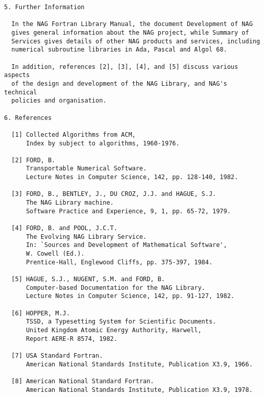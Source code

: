 \newpage
\begin{verbatim}
5. Further Information
 
  In the NAG Fortran Library Manual, the document Development of NAG
  gives general information about the NAG project, while Summary of
  Services gives details of other NAG products and services, including
  numerical subroutine libraries in Ada, Pascal and Algol 68.
 
  In addition, references [2], [3], [4], and [5] discuss various aspects
  of the design and development of the NAG Library, and NAG's technical
  policies and organisation.
 
6. References
 
  [1] Collected Algorithms from ACM,
      Index by subject to algorithms, 1960-1976.
 
  [2] FORD, B.
      Transportable Numerical Software.
      Lecture Notes in Computer Science, 142, pp. 128-140, 1982.
 
  [3] FORD, B., BENTLEY, J., DU CROZ, J.J. and HAGUE, S.J.
      The NAG Library machine.
      Software Practice and Experience, 9, 1, pp. 65-72, 1979.
 
  [4] FORD, B. and POOL, J.C.T.
      The Evolving NAG Library Service.
      In: `Sources and Development of Mathematical Software',
      W. Cowell (Ed.).
      Prentice-Hall, Englewood Cliffs, pp. 375-397, 1984.
 
  [5] HAGUE, S.J., NUGENT, S.M. and FORD, B.
      Computer-based Documentation for the NAG Library.
      Lecture Notes in Computer Science, 142, pp. 91-127, 1982.
 
  [6] HOPPER, M.J.
      TSSD, a Typesetting System for Scientific Documents.
      United Kingdom Atomic Energy Authority, Harwell,
      Report AERE-R 8574, 1982.
 
  [7] USA Standard Fortran.
      American National Standards Institute, Publication X3.9, 1966.
 
  [8] American National Standard Fortran.
      American National Standards Institute, Publication X3.9, 1978.
\end{verbatim}
